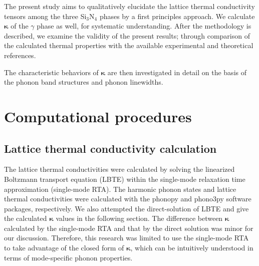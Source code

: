 \documentclass[twocolumn,amsmath,amssymb,a4paper,prb,superscriptaddress,floatfix]{revtex4-1}
\begin{document}
The present study aims to qualitatively elucidate the lattice thermal
conductivity tensors among the three Si$_3$N$_4$ phases by a first principles
approach.  We calculate $\boldsymbol{\kappa}$ of the $\gamma$ phase as well, for
systematic understanding. After the methodology is described, we
examine the validity of the present results; through comparison
of the calculated thermal properties with the available experimental and
theoretical references. 

The characteristic behaviors of  $\boldsymbol{\kappa}$
are then investigated in detail on the basis of the phonon band structures and
phonon linewidths.

\section{Computational procedures}

\subsection{Lattice thermal conductivity calculation}

The lattice thermal conductivities were calculated by solving the linearized
Boltzmann transport equation (LBTE) within the single-mode relaxation time
approximation (single-mode RTA).  The harmonic phonon states and lattice thermal
conductivities were calculated with the phonopy\cite{phonopy} and
phono3py\cite{phono3py} software packages, respectively.  We also attempted the
direct-solution of LBTE\cite{chaput-direct} and give the calculated
$\boldsymbol{\kappa}$ values in the following section. The
difference between
$\boldsymbol{\kappa}$ calculated by the single-mode RTA and that by the direct
solution was minor for our discussion. Therefore, this research was
limited to use the single-mode RTA to take advantage of the closed form of
$\boldsymbol{\kappa}$, which can be intuitively understood in
terms of mode-specific phonon properties.
\end{document}
